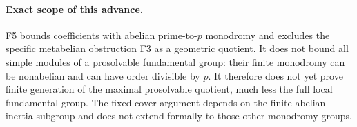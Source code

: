 \paragraph{Exact scope of this advance.}
F5 bounds coefficients with abelian prime-to-$p$ monodromy and
excludes the specific metabelian obstruction F3 as a geometric
quotient. It does not bound all simple modules of a prosolvable
fundamental group: their finite monodromy can be nonabelian and
can have order divisible by $p$. It therefore does not yet prove
finite generation of the maximal prosolvable quotient, much less
the full local fundamental group. The fixed-cover argument depends
on the finite abelian inertia subgroup and does not extend formally
to those other monodromy groups.
